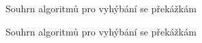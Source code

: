 \documentclass[twoside]{ctuthesis}
\theoremstyle{plain}
\theoremstyle{definition}
\theoremstyle{note}
\begin{document}
\begin{figure}[H]\ContinuedFloat
		\caption{Souhrn algoritmů pro vyhýbání se překážkám \cite[s. 287--290]{cite:20}}
	\newline
\end{figure}
\begin{figure}[H]\ContinuedFloat	
	\caption{Souhrn algoritmů pro vyhýbání se překážkám \cite[s. 287--290]{cite:20}}
	\newline
\end{figure}
\printindex



\end{document}
